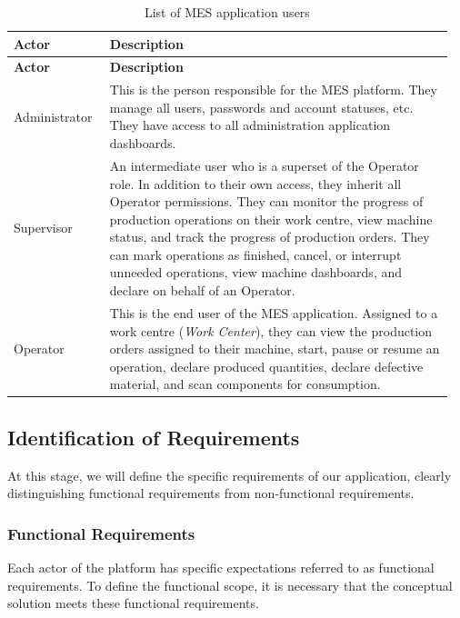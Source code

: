 \begin{longtable}{@{}P{0.21\linewidth}P{0.75\linewidth}@{}}
	\caption{List of MES application users}
	\label{tab:mescha-acteurs} \\
	\toprule
	\textbf{Actor} & \textbf{Description} \\
	\midrule
	\endfirsthead

	\toprule
	\textbf{Actor} & \textbf{Description} \\
	\midrule
	\endhead


	\endlastfoot

	Administrator  &
	This is the person responsible for the MES platform. They manage all users,
	passwords and account statuses, etc. They have access to all
	administration application dashboards. \\[6pt]
	\midrule
	Supervisor     &
	An intermediate user who is a superset of the Operator role. In addition to their 
	own access, they inherit all Operator permissions. They can monitor the progress 
	of production operations on their work centre, view machine status, and track 
	the progress of production orders. They can mark operations as finished, cancel, 
	or interrupt unneeded operations, view machine dashboards, and declare on behalf 
	of an Operator. \\[6pt]
	\midrule
	Operator       &
	This is the end user of the MES application. Assigned to a work centre
	(\textit{Work Center}), they can view the production orders assigned to their machine,
	start, pause or resume an operation, declare produced quantities, declare defective 
	material, and scan components for consumption. \\
	\midrule

\end{longtable}

\subsection{Identification of Requirements}

At this stage, we will define the specific requirements of our
application, clearly distinguishing functional requirements from non-functional
requirements.

\subsubsection*{Functional Requirements}

Each actor of the platform has specific expectations referred to as functional
requirements. To define the functional scope, it is necessary that the conceptual
solution meets these functional requirements.

